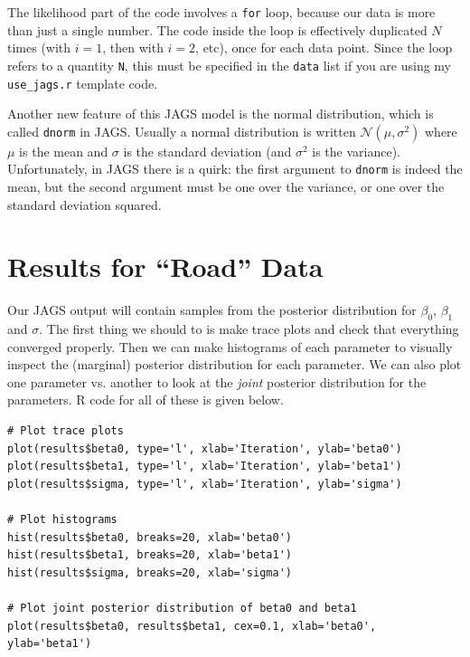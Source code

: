 The likelihood part of the code involves a {\tt for} loop, because our data
is more than just a single number. The code inside the loop is effectively
duplicated $N$ times (with $i=1$, then with $i=2$, etc), once for each data
point. Since the loop refers to a quantity {\tt N}, this must be specified in
the {\tt data} list if you are using my {\tt use\_jags.r} template code.

Another new feature of this JAGS model is the normal distribution, which is
called {\tt dnorm} in JAGS. Usually a normal distribution is written
$\mathcal{N}(\mu, \sigma^2)$ where $\mu$ is the mean and $\sigma$ is the standard
deviation (and $\sigma^2$ is the variance). Unfortunately, in JAGS there is a
quirk: the first argument to {\tt dnorm} is indeed the mean, but the second argument
must be one over the variance, or one over the standard deviation squared.

\section{Results for ``Road'' Data}
Our JAGS output will contain samples from the posterior distribution for
$\beta_0$, $\beta_1$ and $\sigma$. The first thing we should to is make
trace plots and check that everything converged properly. Then we can make
histograms of each parameter to visually inspect the (marginal) posterior
distribution for each parameter. We can also plot one parameter vs. another
to look at the {\it joint} posterior distribution for the parameters. R code
for all of these is given below.

\begin{framed}
\begin{verbatim}
# Plot trace plots
plot(results$beta0, type='l', xlab='Iteration', ylab='beta0')
plot(results$beta1, type='l', xlab='Iteration', ylab='beta1')
plot(results$sigma, type='l', xlab='Iteration', ylab='sigma')

# Plot histograms
hist(results$beta0, breaks=20, xlab='beta0')
hist(results$beta1, breaks=20, xlab='beta1')
hist(results$sigma, breaks=20, xlab='sigma')

# Plot joint posterior distribution of beta0 and beta1
plot(results$beta0, results$beta1, cex=0.1, xlab='beta0', ylab='beta1')
\end{verbatim}
\end{framed}

